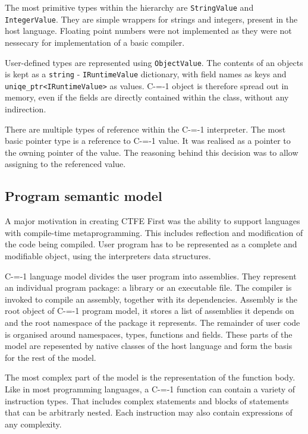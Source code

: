The most primitive types within the hierarchy are \lstinline{StringValue} and \lstinline{IntegerValue}.
They are simple wrappers for strings and integers, present in the host language.
Floating point numbers were not implemented as they were not nessecary for implementation of a basic compiler.

User-defined types are represented using \lstinline{ObjectValue}.
The contents of an objects is kept as a \lstinline{string} - \lstinline{IRuntimeValue} dictionary, with field names as keys and \lstinline{uniqe_ptr<IRuntimeValue>} as values.
C-=-1 object is therefore spread out in memory, even if the fields are directly contained within the class, without any indirection.


There are multiple types of reference within the C-=-1 interpreter.
The most basic pointer type is a reference to C-=-1 value.
It was realised as a pointer to the owning pointer of the value.
The reasoning behind this decision was to allow assigning to the referenced value.

\subsection{Program semantic model}
\label{semantic_model}

A major motivation in creating CTFE First was the ability to support languages with compile-time metaprogramming.
This includes reflection and modification of the code being compiled.
User program has to be represented as a complete and modifiable object, using the interpreters data structures.

C-=-1 language model divides the user program into assemblies.
They represent an individual program package: a library or an executable file.
The compiler is invoked to compile an assembly, together with its dependencies.
Assembly is the root object of C-=-1 program model, it stores a list of assemblies it depends on and the root namespace of the package it represents.
The remainder of user code is organised around namespaces, types, functions and fields.
These parts of the model are repesented by native classes of the host language and form the basis for the rest of the model.

The most complex part of the model is the representation of the function body.
Like in most programming languages, a C-=-1 function can contain a variety of instruction types.
That includes complex statements and blocks of statements that can be arbitrarly nested.
Each instruction may also contain expressions of any complexity.

